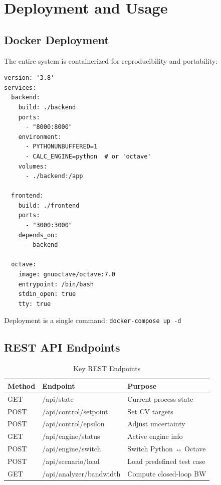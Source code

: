 \documentclass[conference]{IEEEtran}
\begin{document}
\section{Deployment and Usage}

\subsection{Docker Deployment}

The entire system is containerized for reproducibility and portability:

\begin{lstlisting}[caption=docker-compose.yml excerpt]
version: '3.8'
services:
  backend:
    build: ./backend
    ports:
      - "8000:8000"
    environment:
      - PYTHONUNBUFFERED=1
      - CALC_ENGINE=python  # or 'octave'
    volumes:
      - ./backend:/app

  frontend:
    build: ./frontend
    ports:
      - "3000:3000"
    depends_on:
      - backend

  octave:
    image: gnuoctave/octave:7.0
    entrypoint: /bin/bash
    stdin_open: true
    tty: true
\end{lstlisting}

Deployment is a single command: \texttt{docker-compose up -d}

\subsection{REST API Endpoints}

\begin{table}[h]
\centering
\caption{Key REST Endpoints}
\begin{tabular}{|l|l|p{3cm}|}
\hline
\textbf{Method} & \textbf{Endpoint} & \textbf{Purpose} \\
\hline
GET & /api/state & Current process state \\
POST & /api/control/setpoint & Set CV targets \\
POST & /api/control/epsilon & Adjust uncertainty \\
GET & /api/engine/status & Active engine info \\
POST & /api/engine/switch & Switch Python ↔ Octave \\
POST & /api/scenario/load & Load predefined test case \\
GET & /api/analyzer/bandwidth & Compute closed-loop BW \\
\hline
\end{tabular}
\end{table}
\end{document}
